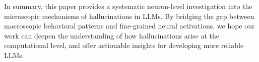 \documentclass[dvipsnames]{article}
\begin{document}
In summary, this paper provides a systematic neuron-level investigation into the microscopic mechanisms of hallucinations in LLMs. By bridging the gap between macroscopic behavioral patterns and fine-grained neural activations, we hope our work can deepen the understanding of how hallucinations arise at the computational level, and offer actionable insights for developing more reliable LLMs. 







\end{document}
